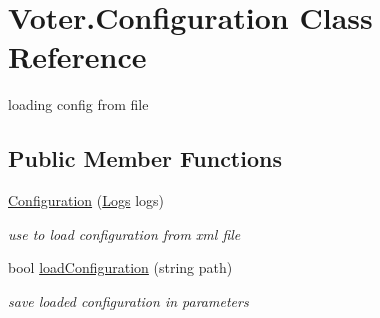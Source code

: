 \hypertarget{class_voter_1_1_configuration}{}\section{Voter.\+Configuration Class Reference}
\label{class_voter_1_1_configuration}


loading config from file  


\subsection*{Public Member Functions}
\begin{DoxyCompactItemize}
\item 
\hyperlink{class_voter_1_1_configuration_aa7cbc6c38cf84a3ecd7bfcd468e33ba8}{Configuration} (\hyperlink{class_voter_1_1_logs}{Logs} logs)
\begin{DoxyCompactList}\small\item\em use to load configuration from xml file \end{DoxyCompactList}\item 
bool \hyperlink{class_voter_1_1_configuration_a8685a1e6e7fc94c6f8c3ee49e78b35cc}{load\+Configuration} (string path)
\begin{DoxyCompactList}\small\item\em save loaded configuration in parameters \end{DoxyCompactList}\end{DoxyCompactItemize}
